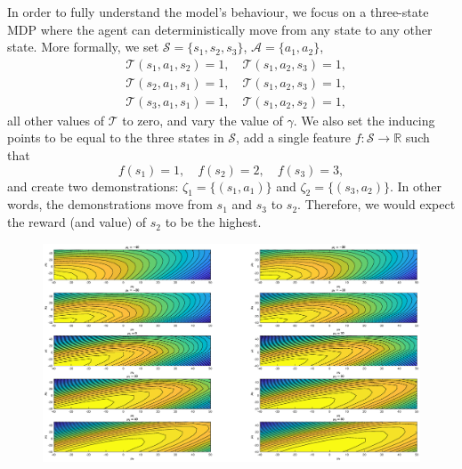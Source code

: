 \documentclass{mpaper}
\begin{document}


In order to fully understand the model's behaviour, we focus on a three-state
MDP where the agent can deterministically move from any state to any other
state. More formally, we set $\mathcal{S} = \{ s_1, s_2, s_3 \}$, $\mathcal{A} =
\{ a_1, a_2 \}$,
\begin{align*}
  &\mathcal{T}(s_1, a_1, s_2) = 1, \quad \mathcal{T}(s_1, a_2, s_3) = 1, \\
  &\mathcal{T}(s_2, a_1, s_1) = 1, \quad \mathcal{T}(s_1, a_2, s_3) = 1, \\
  &\mathcal{T}(s_3, a_1, s_1) = 1, \quad \mathcal{T}(s_1, a_2, s_2) = 1,
\end{align*}
all other values of $\mathcal{T}$ to zero, and vary the value of $\gamma$. We
also set the inducing points to be equal to the three states in $\mathcal{S}$,
add a single feature $f : \mathcal{S} \to \mathbb{R}$ such that
\[
  f(s_1) = 1, \quad f(s_2) = 2, \quad f(s_3) = 3,
\]
and create two demonstrations: $\zeta_1 = \{ (s_1, a_1) \}$ and $\zeta_2 = \{
(s_3, a_2) \}$. In other words, the demonstrations move from $s_1$ and $s_3$ to
$s_2$. Therefore, we would expect the reward (and value) of $s_2$ to be the
highest.

\begin{figure}
  \centering
  \includegraphics[width=\textwidth]{elbo_contour_plots}
\end{figure}
\end{document}
